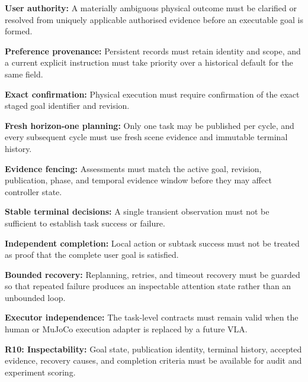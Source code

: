 \documentclass{article}
\begin{document}
\begin{description}
    \item\textbf{User authority:} A materially ambiguous physical outcome
    must be clarified or resolved from uniquely applicable authorised evidence
    before an executable goal is formed.

    \item\textbf{Preference provenance:} Persistent records must retain
    identity and scope, and a current explicit instruction must take priority
    over a historical default for the same field.

    \item\textbf{Exact confirmation:} Physical execution must require
    confirmation of the exact staged goal identifier and revision.

    \item\textbf{Fresh horizon-one planning:} Only one task may be
    published per cycle, and every subsequent cycle must use fresh scene
    evidence and immutable terminal history.

    \item\textbf{Evidence fencing:} Assessments must match the active
    goal, revision, publication, phase, and temporal evidence window before
    they may affect controller state.

    \item\textbf{Stable terminal decisions:} A single transient
    observation must not be sufficient to establish task success or failure.

    \item\textbf{Independent completion:} Local action or subtask success
    must not be treated as proof that the complete user goal is satisfied.

    \item\textbf{Bounded recovery:} Replanning, retries, and timeout
    recovery must be guarded so that repeated failure produces an inspectable
    attention state rather than an unbounded loop.

    \item\textbf{Executor independence:} The task-level contracts must
    remain valid when the human or MuJoCo execution adapter is replaced by a
    future VLA.

    \item\textbf{R10: Inspectability:} Goal state, publication identity,
    terminal history, accepted evidence, recovery causes, and completion
    criteria must be available for audit and experiment scoring.
\end{description}
\end{document}
